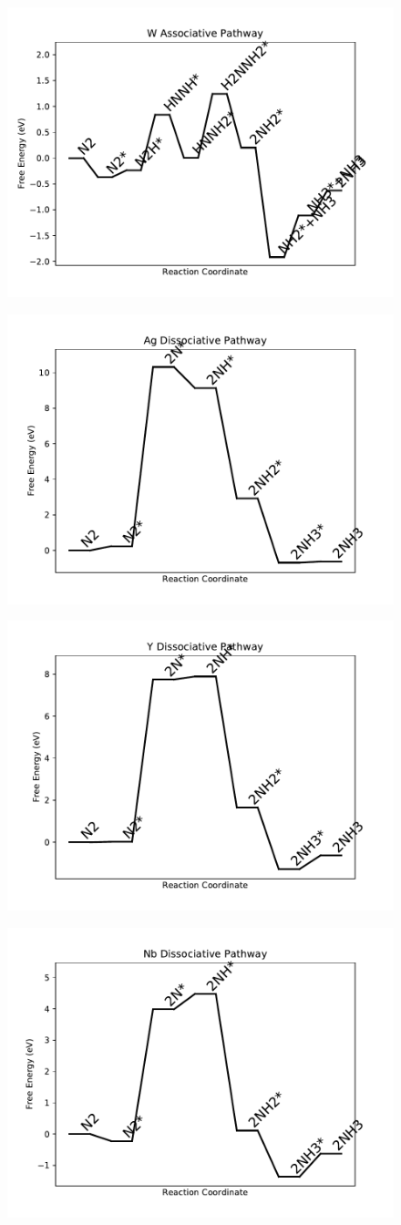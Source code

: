 \documentclass[journal=jacsat,manuscript=article]{achemso}
\begin{document}
\begin{figure}
\includegraphics[width=0.5\linewidth]{data/plots/W_associative.pdf}
\label{fig:W_associative}
\end{figure}

\newpage
\begin{figure}
\includegraphics[width=0.5\linewidth]{data/plots/Ag_dissociative.pdf}
\label{fig:Ag_dissociative}
\end{figure}

\begin{figure}
\includegraphics[width=0.5\linewidth]{data/plots/Y_dissociative.pdf}
\label{fig:Y_dissociative}
\end{figure}

\newpage
\begin{figure}
\includegraphics[width=0.5\linewidth]{data/plots/Nb_dissociative.pdf}
\label{fig:Nb_dissociative}
\end{figure}
\end{document}
